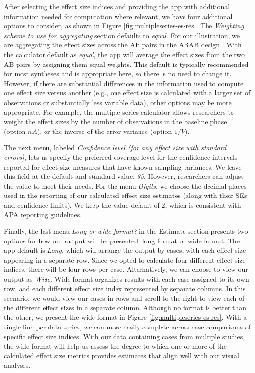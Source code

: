 \documentclass[
]{book}
\begin{document}
After selecting the effect size indices and providing the app with additional information needed for computation where relevant, we have four additional options to consider, as shown in Figure \ref{fig:multipleseries-es-res}. The \emph{Weighting scheme to use for aggregating} section defaults to \emph{equal}. For our illustration, we are aggregating the effect sizes across the AB pairs in the ABAB design \citep{Byiers2014}. With the calculator default as \emph{equal}, the app will average the effect sizes from the two AB pairs by assigning them equal weights. This default is typically recommended for most syntheses and is appropriate here, so there is no need to change it. However, if there are substantial differences in the information used to compute one effect size versus another (e.g., one effect size is calculated with a larger set of observations or substantially less variable data), other options may be more appropriate. For example, the multiple-series calculator allows researchers to weight the effect sizes by the number of observations in the baseline phase (option \(nA\)), or the inverse of the error variance (option \(1/V\)).

The next menu, labeled \emph{Confidence level (for any effect size with standard errors)}, lets us specify the preferred coverage level for the confidence intervals reported for effect size measures that have known sampling variances. We leave this field at the default and standard value, \emph{95}. However, researchers can adjust the value to meet their needs. For the menu \emph{Digits}, we choose the decimal places used in the reporting of our calculated effect size estimates (along with their SEs and confidence limits). We keep the value default of 2, which is consistent with APA reporting guidelines.

Finally, the last menu \emph{Long or wide format?} in the Estimate section presents two options for how our output will be presented: long format or wide format. The app default is \emph{Long}, which will arrange the output by cases, with each effect size appearing in a separate row. Since we opted to calculate four different effect size indices, there will be four rows per case. Alternatively, we can choose to view our output as \emph{Wide}. Wide format organizes results with each case assigned to its own row, and each different effect size index represented by separate columns. In this scenario, we would view our cases in rows and scroll to the right to view each of the different effect sizes in a separate column. Although no format is better than the other, we present the wide format in Figure \ref{fig:multipleseries-es-res}. With a single line per data series, we can more easily complete across-case comparisons of specific effect size indices. With our data containing cases from multiple studies, the wide format will help us assess the degree to which one or more of the calculated effect size metrics provides estimates that align well with our visual analyses.
\end{document}
